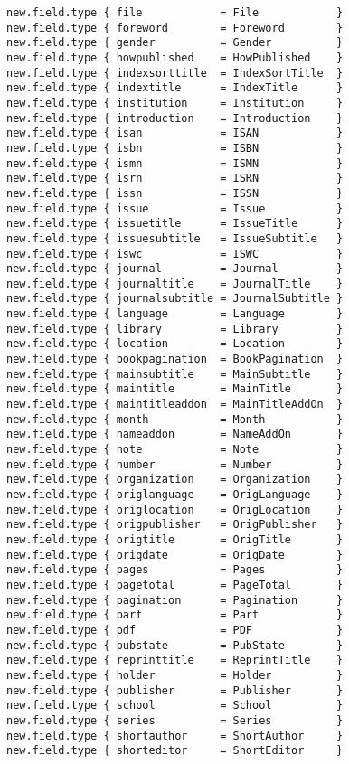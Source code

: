 \documentclass[11pt,a4paper]{scrbook}
\begin{document}
\begin{lstlisting}[language=BibTool]
new.field.type { file            = File            }
new.field.type { foreword        = Foreword        }
new.field.type { gender          = Gender          }
new.field.type { howpublished    = HowPublished    }
new.field.type { indexsorttitle  = IndexSortTitle  }
new.field.type { indextitle      = IndexTitle      }
new.field.type { institution     = Institution     }
new.field.type { introduction    = Introduction    }
new.field.type { isan            = ISAN            }
new.field.type { isbn            = ISBN            }
new.field.type { ismn            = ISMN            }
new.field.type { isrn            = ISRN            }
new.field.type { issn            = ISSN            }
new.field.type { issue           = Issue           }
new.field.type { issuetitle      = IssueTitle      }
new.field.type { issuesubtitle   = IssueSubtitle   }
new.field.type { iswc            = ISWC            }
new.field.type { journal         = Journal         }
new.field.type { journaltitle    = JournalTitle    }
new.field.type { journalsubtitle = JournalSubtitle }
new.field.type { language        = Language        }
new.field.type { library         = Library         }
new.field.type { location        = Location        }
new.field.type { bookpagination  = BookPagination  }
new.field.type { mainsubtitle    = MainSubtitle    }
new.field.type { maintitle       = MainTitle       }
new.field.type { maintitleaddon  = MainTitleAddOn  }
new.field.type { month           = Month           }
new.field.type { nameaddon       = NameAddOn       }
new.field.type { note            = Note            }
new.field.type { number          = Number          }
new.field.type { organization    = Organization    }
new.field.type { origlanguage    = OrigLanguage    }
new.field.type { origlocation    = OrigLocation    }
new.field.type { origpublisher   = OrigPublisher   }
new.field.type { origtitle       = OrigTitle       }
new.field.type { origdate        = OrigDate        }
new.field.type { pages           = Pages           }
new.field.type { pagetotal       = PageTotal       }
new.field.type { pagination      = Pagination      }
new.field.type { part            = Part            }
new.field.type { pdf             = PDF             }
new.field.type { pubstate        = PubState        }
new.field.type { reprinttitle    = ReprintTitle    }
new.field.type { holder          = Holder          }
new.field.type { publisher       = Publisher       }
new.field.type { school          = School          }
new.field.type { series          = Series          }
new.field.type { shortauthor     = ShortAuthor     }
new.field.type { shorteditor     = ShortEditor     }

\end{lstlisting}
\end{document}
